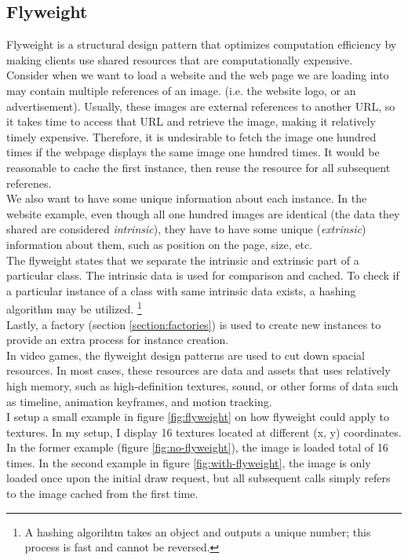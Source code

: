 \begin{multicols}{2}
\subsection{Flyweight}
Flyweight is a structural design pattern that optimizes computation efficiency by making clients use shared resources that are computationally expensive.\cite{sm-flyweight}\bs
\\
Consider when we want to load a website and the web page we are loading into may contain multiple references of an image. (i.e. the website logo, or an advertisement). Usually, these images are external references to another URL, so it takes time to access that URL and retrieve the image, making it relatively timely expensive. Therefore, it is undesirable to fetch the image one hundred times if the webpage displays the same image one hundred times. It would be reasonable to cache the first instance, then reuse the resource for all subsequent referenes.\bs
\\
We also want to have some unique information about each instance. In the website example, even though all one hundred images are identical (the data they shared are considered \textit{intrinsic}), they have to have some unique (\textit{extrinsic}) information about them, such as position on the page, size, etc.\bs
\\
The flyweight states that we separate the intrinsic and extrinsic part of a particular class\cite{sm-flyweight}. The intrinsic data is used for comparison and cached. To check if a particular instance of a class with same intrinsic data exists, a hashing algorithm may be utilized. \footnote{A hashing algorihtm takes an object and outputs a unique number; this process is fast and cannot be reversed.}\bs
\\
Lastly, a factory (section \ref{section:factories}) is used to create new instances to provide an extra process for instance creation\cite{sm-flyweight}.\bs
\\
In video games, the flyweight design patterns are used to cut down spacial resources. In most cases, these resources are data and assets that uses relatively high memory, such as high-definition textures, sound, or other forms of data such as timeline, animation keyframes, and motion tracking.\bs
\\
I setup a small example in figure \ref{fig:flyweight} on how flyweight could apply to textures. In my setup, I display 16 textures located at different (x, y) coordinates. In the former example (figure \ref{fig:no-flyweight}), the image is loaded total of 16 times. In the second example in figure \ref{fig:with-flyweight}, the image is only loaded once upon the initial draw request, but all subsequent calls simply refers to the image cached from the first time.


\end{multicols}
